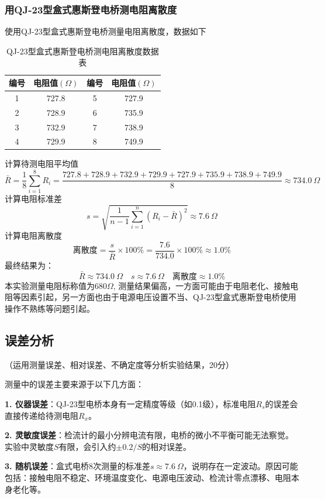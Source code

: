 \documentclass[10pt,a4paper]{ctexart}
\newcommand{\myspace}[1]{\par\vspace{#1\baselineskip}} %
\newcommand{\xiaosi}{\fontsize{12pt}{16pt}\selectfont}
\begin{document}
    \subsubsection{用QJ-23型盒式惠斯登电桥测电阻离散度}
    使用QJ-23型盒式惠斯登电桥测量电阻离散度，数据如下
    \begin{table}[H]
        \centering
        \begin{tabular}{|c|c|c|c|}
            \hline
            编号 & 电阻值$(\Omega)$ & 编号 & 电阻值$(\Omega)$ \\
            \hline
             1 & 727.8 & 5 & 727.9 \\
            \hline
             2 & 728.9 & 6 & 735.9 \\
            \hline
             3 & 732.9 & 7 & 738.9 \\
            \hline
             4 & 729.9 & 8 & 749.9 \\
            \hline
        \end{tabular}
        \caption{QJ-23型盒式惠斯登电桥测电阻离散度数据表}
    \end{table}
    计算待测电阻平均值
    \[
\bar{R} = \frac{1}{8} \sum_{i=1}^8 R_i 
= \frac{727.8 + 728.9 + 732.9 + 729.9 + 727.9 + 735.9 + 738.9 + 749.9}{8} \approx 734.0\ \Omega
\]
    计算电阻标准差
    \[
s = \sqrt{\frac{1}{n-1} \sum_{i=1}^n (R_i - \bar{R})^2}
\approx 7.6\ \Omega
\]
    计算电阻离散度
\[
\text{离散度} = \frac{s}{\bar{R}} \times 100\% 
= \frac{7.6}{734.0} \times 100\% \approx 1.0\%
\]
最终结果为：
\[
\boxed{\bar{R} \approx 734.0\ \Omega}\quad
\boxed{s \approx 7.6\ \Omega}\quad
\boxed{\text{离散度} \approx 1.0\%}
\]
本实验测量电阻标称值为$680 \Omega$, 测量结果偏高，一方面可能由于电阻老化、接触电阻等因素引起，另一方面也由于电源电压设置不当、QJ-23型盒式惠斯登电桥使用操作不熟练等问题引起。
    \myspace{2}
\subsection{误差分析}
    \xiaosi （运用测量误差、相对误差、不确定度等分析实验结果，20分）

测量中的误差主要来源于以下几方面：

\noindent\textbf{1. 仪器误差}：QJ-23型电桥本身有一定精度等级（如0.1级），标准电阻\(R_s\)的误差会直接传递给待测电阻\(R_x\)。

\noindent\textbf{2. 灵敏度误差}：检流计的最小分辨电流有限，电桥的微小不平衡可能无法察觉。实验中灵敏度\(S\)有限，会引入约\(\pm 0.2/S\)的相对误差。

\noindent\textbf{3. 随机误差}：盒式电桥8次测量的标准差\(s \approx 7.6\ \Omega\)，说明存在一定波动。原因可能包括：接触电阻不稳定、环境温度变化、电源电压波动、检流计零点漂移、电阻本身老化等。
\end{document}
